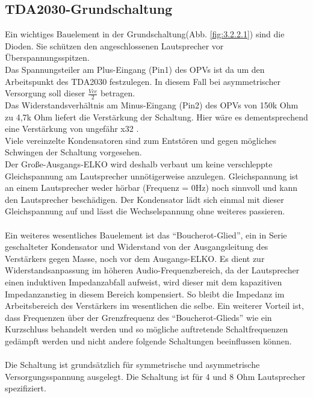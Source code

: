 \subsection{TDA2030-Grundschaltung}\label{subsec:3.2.2}
Ein wichtiges Bauelement in der Grundschaltung(Abb. \ref{fig:3.2.2.1}) sind die Dioden. Sie schützen den angeschlossenen Lautsprecher vor Überspannungsspitzen.\\
Das Spannungsteiler am Plus-Eingang (Pin1) des OPVs ist da um den Arbeitspunkt des TDA2030 festzulegen.
In diesem Fall bei asymmetrischer Versorgung soll dieser $\frac{Vcc}{2}$ betragen.\\
Das Widerstandsverhältnis am Minus-Eingang (Pin2) des OPVs von 150k Ohm zu 4,7k Ohm liefert die Verstärkung der Schaltung.
Hier wäre es dementsprechend eine Verstärkung von ungefähr x32 .\\
Viele vereinzelte Kondensatoren sind zum Entstören und gegen mögliches Schwingen der Schaltung vorgesehen.\\
Der Große-Ausgangs-ELKO wird deshalb verbaut um keine verschleppte Gleichspannung am Lautsprecher unnötigerweise anzulegen.
Gleichspannung ist an einem Lautsprecher weder hörbar (Frequenz = 0Hz) noch sinnvoll und kann den Lautsprecher beschädigen.
Der Kondensator lädt sich einmal mit dieser Gleichspannung auf und lässt die Wechselspannung ohne weiteres passieren.\\\\
Ein weiteres wesentliches Bauelement ist das \enquote{Boucherot-Glied}, ein in Serie geschalteter Kondensator und Widerstand von der Ausgangsleitung des Verstärkers gegen Masse, noch vor dem Ausgangs-ELKO.
Es dient zur Widerstandsanpassung im höheren Audio-Frequenzbereich, da der Lautsprecher einen induktiven Impedanzabfall aufweist, wird dieser mit dem kapazitiven Impedanzanstieg in diesem Bereich kompensiert.
So bleibt die Impedanz im Arbeitsbereich des Verstärkers im wesentlichen die selbe.
Ein weiterer Vorteil ist, dass Frequenzen über der Grenzfrequenz des \enquote{Boucherot-Glieds} wie ein Kurzschluss behandelt werden und so mögliche auftretende Schaltfrequenzen gedämpft werden und nicht andere folgende Schaltungen beeinflussen können.\\\\
Die Schaltung ist grundsätzlich für symmetrische und asymmetrische Versorgungsspannung ausgelegt. 
Die Schaltung ist für 4 und 8 Ohm Lautsprecher spezifiziert.
